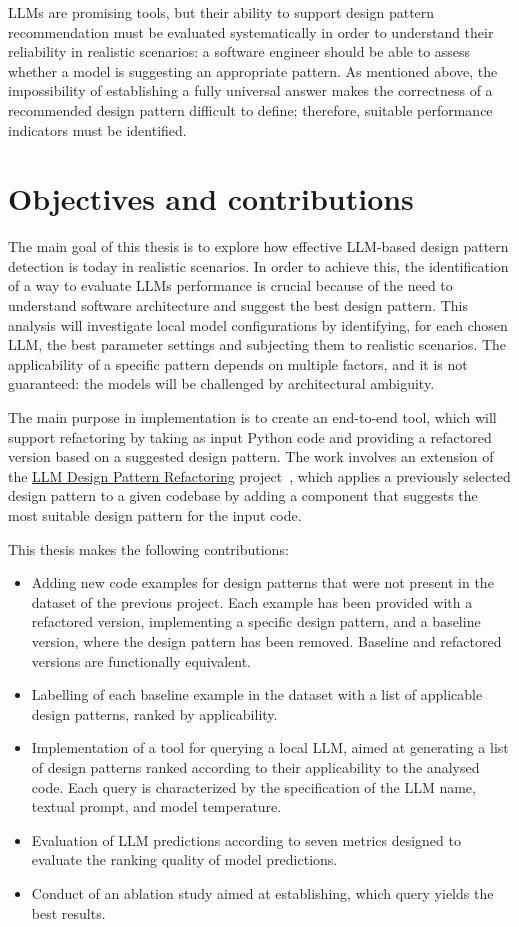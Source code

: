 LLMs are promising tools, but their ability to support design pattern recommendation must be evaluated systematically
in order to understand their reliability in realistic scenarios: a software engineer should be able to assess whether
a model is suggesting an appropriate pattern.
As mentioned above, the impossibility of establishing a fully universal
answer makes the correctness of a recommended design pattern difficult to define; therefore, suitable performance
indicators must be identified.


\section{Objectives and contributions}\label{sec:objectives-and-contributions}
The main goal of this thesis is to explore how effective LLM-based design pattern detection is today in realistic
scenarios.
In order to achieve this, the identification of a way to evaluate LLMs performance is crucial because of the
need to understand software architecture and suggest the best design pattern.
This analysis will investigate local model
configurations by identifying, for each chosen LLM, the best parameter settings and subjecting them to realistic
scenarios.
The applicability of a specific pattern depends on multiple factors, and it is not guaranteed: the models
will be challenged by architectural ambiguity.

The main purpose in implementation is to create an end-to-end tool, which will support refactoring by taking
as input Python code and providing a refactored version based on a suggested design pattern.
The work involves an extension of the \underline{LLM Design Pattern Refactoring}
project~\cite{zisa2024llmdesignpatternrefactoring}, which applies a previously selected design pattern to a given
codebase by adding a component that suggests the most suitable design pattern for the input code.

This thesis makes the following contributions:
\begin{itemize}
    \item Adding new code examples for design patterns that were not present in the dataset of the previous project.
    Each example has been provided with a refactored version, implementing a specific design pattern, and a baseline version, where the design pattern has been removed.
    Baseline and refactored versions are functionally equivalent.
    \item Labelling of each baseline example in the dataset with a list of applicable design patterns, ranked by applicability.
    \item Implementation of a tool for querying a local LLM, aimed at generating a list of design patterns ranked according to their applicability to the analysed code.
    Each query is characterized by the specification of the LLM name, textual prompt, and model temperature.
    \item Evaluation of LLM predictions according to seven metrics designed to evaluate the ranking quality of model predictions.
    \item Conduct of an ablation study aimed at establishing, which query yields the best results.
\end{itemize}

